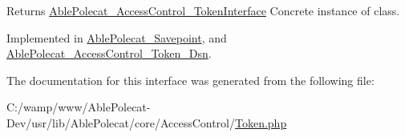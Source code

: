 \begin{DoxyReturn}{Returns}
\hyperlink{interface_able_polecat___access_control___token_interface}{Able\+Polecat\+\_\+\+Access\+Control\+\_\+\+Token\+Interface} Concrete instance of class. 
\end{DoxyReturn}


Implemented in \hyperlink{class_able_polecat___savepoint_a239b1c70258014a86569483c2d009de6}{Able\+Polecat\+\_\+\+Savepoint}, and \hyperlink{class_able_polecat___access_control___token___dsn_a239b1c70258014a86569483c2d009de6}{Able\+Polecat\+\_\+\+Access\+Control\+\_\+\+Token\+\_\+\+Dsn}.



The documentation for this interface was generated from the following file\+:\begin{DoxyCompactItemize}
\item 
C\+:/wamp/www/\+Able\+Polecat-\/\+Dev/usr/lib/\+Able\+Polecat/core/\+Access\+Control/\hyperlink{_token_8php}{Token.\+php}\end{DoxyCompactItemize}
